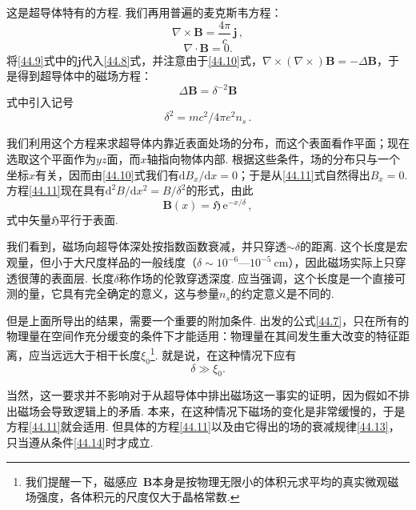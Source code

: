 这是超导体特有的方程. 我们再用普遍的麦克斯韦方程：
\begin{equation}
\nabla\times\bm B = \frac{4\pi}{c}\,\bm j\,,
\label{44.9}
\end{equation}
\begin{equation}
\nabla\cdot\bm B = 0.
\label{44.10}
\end{equation}
将\eqref{44.9}式中的$\bm j$代入\eqref{44.8}式，并注意由于\eqref{44.10}式，$\nabla\times(\nabla\times)\bm B=-\Delta\bm B$，于是得到超导体中的磁场方程：
\begin{equation}
\Delta\bm B = \delta^{-2}\bm B
\label{44.11}
\end{equation}
式中引入记号
\begin{equation}
\delta^2 = mc^2/4\pi e^2n_s\,.
\label{44.12}
\end{equation}

我们利用这个方程来求超导体内靠近表面处场的分布，而这个表面看作平面；现在选取这个平面作为$yz$面，而$x$轴指向物体内部. 根据这些条件，场的分布只与一个坐标$x$有关，因而由\eqref{44.10}式我们有$\mathrm dB_x/\mathrm dx=0$；于是从\eqref{44.11}式自然得出$B_x=0$. 方程\eqref{44.11}现在具有$\mathrm d^2B/\mathrm dx^2=B/\delta^2$的形式，由此
\begin{equation}
\bm B(x) = \pmb{\mathfrak H}\,\mathrm e^{-x/\delta}\,,
\label{44.13}
\end{equation}
式中矢量$\pmb{\mathfrak H}$平行于表面.

我们看到，磁场向超导体深处按指数函数衰减，并只穿透$\sim\delta$的距离. 这个长度是宏观量，但小于大尺度样品的一般线度（$\delta\sim10^{-6}$—$10^{-5}\ \mathrm{cm}$），因此磁场实际上只穿透很薄的表面层. 长度$\delta$称作场的伦敦穿透深度. 应当强调，这个长度是一个直接可测的量，它具有完全确定的意义，这与参量$n_s$的约定意义是不同的.

但是上面所导出的结果，需要一个重要的附加条件. 出发的公式\eqref{44.7}，只在所有的物理量在空间作充分缓变的条件下才能适用：物理量在其间发生重大改变的特征距离，应当远远大于相干长度$\xi_0$\footnote{我们提醒一下，磁感应~$\bm B$本身是按物理无限小的体积元求平均的真实微观磁场强度，各体积元的尺度仅大于晶格常数.}. 就是说，在这种情况下应有
\begin{equation}
\delta\gg\xi_0.
\label{44.14}
\end{equation}

当然，这一要求并不影响对于从超导体中排出磁场这一事实的证明，因为假如不排出磁场会导致逻辑上的矛盾. 本来，在这种情况下磁场的变化是非常缓慢的，于是方程\eqref{44.11}就会适用. 但具体的方程\eqref{44.11}以及由它得出的场的衰减规律\eqref{44.13}，只当遵从条件\eqref{44.14}时才成立.

